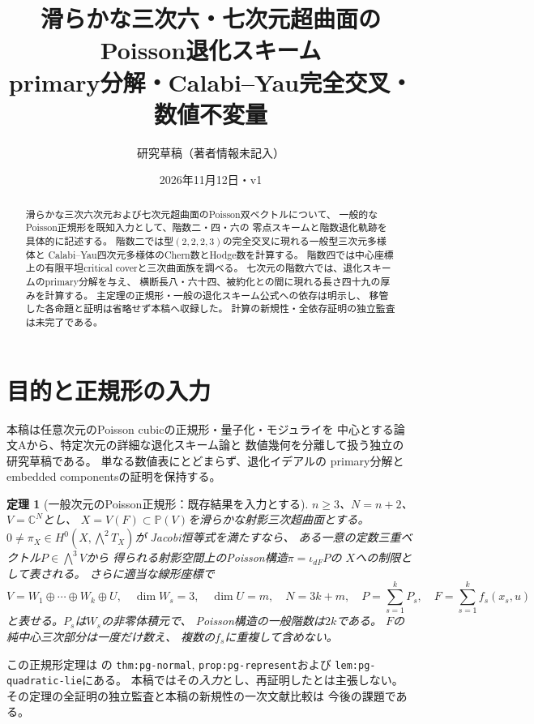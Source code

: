 \documentclass[11pt,a4paper]{ltjsarticle}
\title{滑らかな三次六・七次元超曲面のPoisson退化スキーム\\
\large primary分解・Calabi--Yau完全交叉・数値不変量}
\author{研究草稿（著者情報未記入）}
\date{2026年11月12日・v1}
\numberwithin{equation}{section}
\newtheorem{theorem}{定理}[section]
\newcommand{\CC}{\mathbb C}
\newcommand{\PP}{\mathbb P}
\begin{document}
\maketitle
\begin{abstract}
滑らかな三次六次元および七次元超曲面のPoisson双ベクトルについて、
一般的なPoisson正規形を既知入力として、階数二・四・六の
零点スキームと階数退化軌跡を具体的に記述する。
階数二では型$(2,2,2,3)$の完全交叉に現れる一般型三次元多様体と
Calabi--Yau四次元多様体のChern数とHodge数を計算する。
階数四では中心座標上の有限平坦critical coverと三次曲面族を調べる。
七次元の階数六では、退化スキームのprimary分解を与え、
横断長八・六十四、被約化との間に現れる長さ四十九の厚みを計算する。
主定理の正規形・一般の退化スキーム公式への依存は明示し、
移管した各命題と証明は省略せず本稿へ収録した。
計算の新規性・全依存証明の独立監査は未完了である。
\end{abstract}
\tableofcontents

\section{目的と正規形の入力}\label{sec:geometry-input}
本稿は任意次元のPoisson cubicの正規形・量子化・モジュライを
中心とする論文Aから、特定次元の詳細な退化スキーム論と
数値幾何を分離して扱う独立の研究草稿である。
単なる数値表にとどまらず、退化イデアルの
primary分解とembedded componentsの証明を保持する。

\begin{theorem}[一般次元のPoisson正規形：既存結果を入力とする]
\label{thm:pg-normal}
$n\ge3$、$N=n+2$、$V=\CC^N$とし、
$X=V(F)\subset\PP(V)$を滑らかな射影三次超曲面とする。
$0\ne\pi_X\in H^0(X,\bigwedge^2T_X)$が
Jacobi恒等式を満たすなら、
ある一意の定数三重ベクトル$P\in\bigwedge^3V$から
得られる射影空間上のPoisson構造$\pi=\iota_{dF}P$の
$X$への制限として表される。
さらに適当な線形座標で
\begin{equation}
 V=W_1\oplus\cdots\oplus W_k\oplus U,\quad
 \dim W_s=3,\quad \dim U=m,\quad
 N=3k+m,\quad
 P=\sum_{s=1}^k P_s,\quad
 F=\sum_{s=1}^k f_s(x_s,u)
 \label{eq:input-normal-form}
\end{equation}
と表せる。$P_s$は$W_s$の非零体積元で、
Poisson構造の一般階数は$2k$である。
$F$の純中心三次部分は一度だけ数え、
複数の$f_s$に重複して含めない。
\end{theorem}
この正規形定理は
\cite{ncCubicA}の
\texttt{thm:pg-normal}, \texttt{prop:pg-represent}および
\texttt{lem:pg-quadratic-lie}にある。
本稿ではその\emph{入力}とし、再証明したとは主張しない。
その定理の全証明の独立監査と本稿の新規性の一次文献比較は
今後の課題である。
\end{document}
